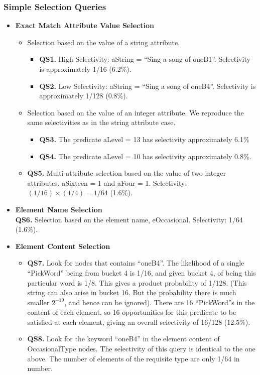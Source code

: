 \subsubsection{Simple Selection Queries}
\begin {itemize}

\item {\bf Exact Match Attribute Value Selection}
\begin{itemize}
\item
Selection based on the value of a string attribute.
\begin{itemize}
\item {\bf QS1.} High Selectivity: {\sf aString = ``Sing a song of oneB1''}.
Selectivity is approximately 1/16 (6.2\%).
\item {\bf QS2.} Low Selectivity: {\sf aString = ``Sing a song of oneB4''}.
Selectivity is approximately 1/128 (0.8\%).
\end{itemize}
\item
Selection based on the value of an integer attribute.  We reproduce
the same selectivities as in the string attribute case.  
\begin{itemize}
\item {\bf QS3.} The predicate
{\sf aLevel = 13} has selectivity approximately 6.1\%
\item {\bf QS4.} The 
predicate {\sf aLevel = 10} has selectivity approximately 0.8\%.
\end{itemize}
\item
{\bf QS5.} Multi-attribute selection based on the value of two integer
attributes. {\sf aSixteen = 1 and aFour = 1}. Selectivity: $(1/16) \times (1/4) = 1/64$ (1.6\%).
\end{itemize}

\item {\bf Element Name Selection} \\
{\bf QS6.} Selection based on the element
name, {\sf eOccasional}. Selectivity: 1/64 (1.6\%).

\item {\bf Element Content Selection}
\begin{itemize}
\item
{\bf QS7.} Look for nodes that contains {\sf ``oneB4''}.
The likelihood of a single ``PickWord'' being from bucket 4 is 1/16,
and given bucket 4, of being this particular word is 1/8.  This gives
a product probability of 1/128.  (This string can also arise in bucket
16.  But the probability there is much smaller $2^{-19}$, and hence
can be ignored). There are 16 ``PickWord''s in the content of
each element, so 16 opportunities for this predicate to be satisfied at
each element, giving an overall selectivity of 16/128 (12.5\%).
\item
{\bf QS8.} Look for the keyword ``oneB4'' in the element content of {\sf
OccasionalType} nodes.  The selectivity of this query is identical to
the one above.  The number of elements of the requisite type are only
1/64 in number.
\end{itemize}


\end{itemize}
